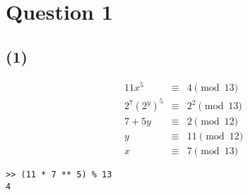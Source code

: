 \section*{Question 1}
\subsection*{(1)}
\begin{eqnarray*}
        11x^5 & \equiv & 4   \pmod{13} \\
  2^7 (2^y)^5 & \equiv & 2^2 \pmod{13} \\
       7 + 5y & \equiv & 2   \pmod{12} \\
            y & \equiv & 11  \pmod{12} \\
            x & \equiv & 7   \pmod{13}
\end{eqnarray*}
\begin{verbatim}
>> (11 * 7 ** 5) % 13
4
\end{verbatim}